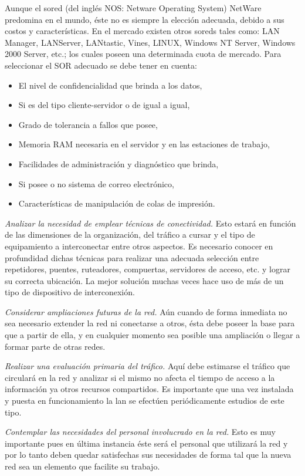 Aunque el \gls{sored}  (del inglés NOS: Netware Operating System) NetWare predomina en el mundo, éste no es siempre la elección adecuada, debido a sus costos y características. En el mercado existen otros \glspl{sored} tales como: LAN Manager, LANServer, LANtastic, Vines, LINUX, Windows NT Server, Windows 2000 Server, etc.; los cuales poseen una determinada cuota de mercado. Para seleccionar el SOR adecuado se debe tener en cuenta:

\begin{itemize}
\item El nivel de confidencialidad que brinda a los datos,
\item Si es del tipo cliente-servidor o de igual a igual,
\item Grado de tolerancia a fallos que posee,
\item Memoria RAM necesaria en el servidor y en las estaciones de trabajo,
\item Facilidades de administración y diagnóstico que brinda,
\item Si posee o no sistema de correo electrónico,
\item Características de manipulación de colas de impresión.
\end{itemize}

\textit{Analizar la necesidad de emplear técnicas de conectividad.} Esto estará en función de las dimensiones de la organización, del tráfico a cursar y el tipo de equipamiento a interconectar entre otros aspectos. Es necesario conocer en profundidad dichas técnicas para realizar una adecuada selección entre repetidores, puentes, ruteadores, compuertas, servidores de acceso, etc. y lograr su correcta ubicación. La mejor solución muchas veces hace uso de más de un tipo de dispositivo de interconexión.

\textit{Considerar ampliaciones futuras de la red.} Aún cuando de forma inmediata no sea necesario extender la red ni conectarse a otros, ésta debe poseer la base para que a partir de ella, y en cualquier momento sea posible una ampliación o llegar a formar parte de otras redes.

\textit{Realizar una evaluación primaria del tráfico.} Aquí debe estimarse el tráfico que circulará en la red y analizar si el mismo no afecta el tiempo de acceso a la información ya otros recursos compartidos. Es importante que una vez instalada y puesta en funcionamiento la \gls{lan} se efectúen periódicamente estudios de este tipo.

\textit{Contemplar las necesidades del personal involucrado en la red.} Esto es muy importante pues en última instancia éste será el personal que utilizará la red y por lo tanto deben quedar satisfechas sus necesidades de forma tal que la nueva red sea un elemento que facilite su trabajo.

